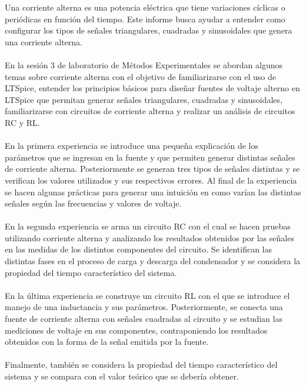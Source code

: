 \documentclass[letterpaper,11pt]{article} %
\begin{document}
	



\begin{resumen}
Una corriente alterna es una potencia eléctrica que tiene variaciones cíclicas o periódicas en función del tiempo. Este informe busca ayudar a entender como configurar los tipos de señales triangulares, cuadradas y sinusoidales que genera una corriente alterna. \\ \\ En la sesión 3 de laboratorio de Métodos Experimentales se abordan algunos temas sobre corriente alterna con el objetivo de familiarizarse con el uso de LTSpice, entender los principios básicos para diseñar fuentes de voltaje alterno en LTSpice que permitan generar señales triangulares, cuadradas y sinusoidales, familiarizarse con circuitos de corriente alterna y realizar un análisis de circuitos RC y RL.\\ \\
En la primera experiencia se introduce una pequeña explicación de los parámetros que se ingresan en la fuente y que permiten generar distintas señales de corriente alterna. Posteriormente se generan tres tipos de señales distintas y se verifican los valores utilizados y sus respectivos errores. Al final de la experiencia se hacen algunas prácticas para generar una intuición en como varían las distintas señales según las frecuencias y valores de voltaje.\\ \\
En la segunda experiencia se arma un circuito RC con el cual se hacen pruebas utilizando corriente alterna y analizando los resultados obtenidos por las señales en las medidas de los distintos componentes del circuito. Se identifican las distintas fases en el proceso de carga y descarga del condensador y se considera la propiedad del tiempo característico del sistema.\\ \\
En la última experiencia se construye un circuito RL con el que se introduce el manejo de una inductancia y sus parámetros. Posteriormente, se conecta una fuente de corriente alterna con señales cuadradas al circuito y se estudian las mediciones de voltaje en sus componentes, contraponiendo los resultados obtenidos con la forma de la señal emitida por la fuente.\\ \\ Finalmente, también se considera la propiedad del tiempo característico del sistema y se compara con el valor teórico que se debería obtener.
\end{resumen}
\end{document}
